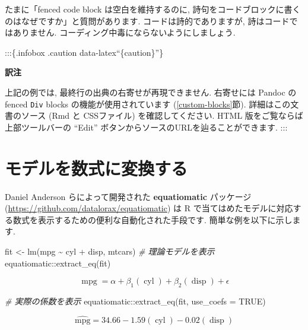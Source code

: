 \documentclass[
  11pt,
  lualatex,ja=standard,jafont=noto]{bxjsreport}
\newenvironment{Shaded}{\begin{snugshade}}{\end{snugshade}}
\newcommand{\AttributeTok}[1]{\textcolor[rgb]{0.77,0.63,0.00}{#1}}
\newcommand{\CommentTok}[1]{\textcolor[rgb]{0.56,0.35,0.01}{\textit{#1}}}
\newcommand{\ConstantTok}[1]{\textcolor[rgb]{0.00,0.00,0.00}{#1}}
\newcommand{\FunctionTok}[1]{\textcolor[rgb]{0.00,0.00,0.00}{#1}}
\newcommand{\NormalTok}[1]{#1}
\newcommand{\OtherTok}[1]{\textcolor[rgb]{0.56,0.35,0.01}{#1}}
\newcommand{\SpecialCharTok}[1]{\textcolor[rgb]{0.00,0.00,0.00}{#1}}
\begin{document}
たまに「fenced code block は空白を維持するのに, 詩句をコードブロックに書くのはなぜですか」と質問があります. コードは詩的でありますが, 詩はコードではありません. コーディング中毒にならないようにしましょう.

:::\{.infobox .caution data-latex``\{caution\}''\}

\textbf{訳注}

上記の例では, 最終行の出典の右寄せが再現できません. 右寄せには Pandoc の fenced \texttt{Div} blocks の機能が使用されています (\ref{custom-blocks}節). 詳細はこの文書のソース (Rmd と CSSファイル) を確認してください. HTML 版をご覧ならば上部ツールバーの ``Edit'' ボタンからソースのURLを辿ることができます. :::

\hypertarget{equatiomatic}{%
\section{モデルを数式に変換する}\label{equatiomatic}}

Daniel Anderson らによって開発された \textbf{equatiomatic} パッケージ \autocite{R-equatiomatic} (\url{https://github.com/datalorax/equatiomatic}) は R で当てはめたモデルに対応する数式を表示するための便利な自動化された手段です. 簡単な例を以下に示します.

\begin{Shaded}
\begin{Highlighting}[numbers=left,,]
\NormalTok{fit }\OtherTok{\textless{}{-}} \FunctionTok{lm}\NormalTok{(mpg }\SpecialCharTok{\textasciitilde{}}\NormalTok{ cyl }\SpecialCharTok{+}\NormalTok{ disp, mtcars)}
\CommentTok{\# 理論モデルを表示}
\NormalTok{equatiomatic}\SpecialCharTok{::}\FunctionTok{extract\_eq}\NormalTok{(fit)}
\end{Highlighting}
\end{Shaded}

\[
\operatorname{mpg} = \alpha + \beta_{1}(\operatorname{cyl}) + \beta_{2}(\operatorname{disp}) + \epsilon
\]

\begin{Shaded}
\begin{Highlighting}[numbers=left,,]
\CommentTok{\# 実際の係数を表示}
\NormalTok{equatiomatic}\SpecialCharTok{::}\FunctionTok{extract\_eq}\NormalTok{(fit, }\AttributeTok{use\_coefs =} \ConstantTok{TRUE}\NormalTok{)}
\end{Highlighting}
\end{Shaded}

\[
\operatorname{\widehat{mpg}} = 34.66 - 1.59(\operatorname{cyl}) - 0.02(\operatorname{disp})
\]
\end{document}
